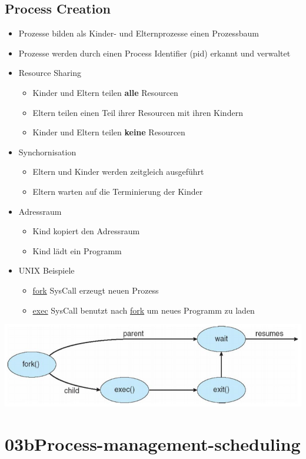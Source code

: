 \documentclass[a4paper]{scrreprt}
\begin{document}
\section{Process Creation}
	\begin{itemize}
		\item Prozesse bilden als Kinder- und Elternprozesse einen Prozessbaum
		\item Prozesse werden durch einen Process Identifier (pid) erkannt und verwaltet
		\item Resource Sharing
		\begin{itemize}
			\item Kinder und Eltern teilen \textbf{alle} Resourcen
			\item Eltern teilen einen Teil ihrer Resourcen mit ihren Kindern
			\item Kinder und Eltern teilen \textbf{keine} Resourcen
		\end{itemize}
		\item Synchornisation
		\begin{itemize}
			\item Eltern und Kinder werden zeitgleich ausgeführt
			\item Eltern warten auf die Terminierung der Kinder
		\end{itemize}
		\item Adressraum
		\begin{itemize}
			\item Kind kopiert den Adressraum
			\item Kind lädt ein Programm
		\end{itemize}
		\item UNIX Beispiele
		\begin{itemize}
			\item \underline{fork} SysCall erzeugt neuen Prozess
			\item \underline{exec} SysCall benutzt nach \underline{fork} um neues Programm zu laden
		\end{itemize}
	\end{itemize}
	\includegraphics[scale = 0.6]{graphics/process_fork.png}
\chapter{03bProcess-management-scheduling}
\end{document}

